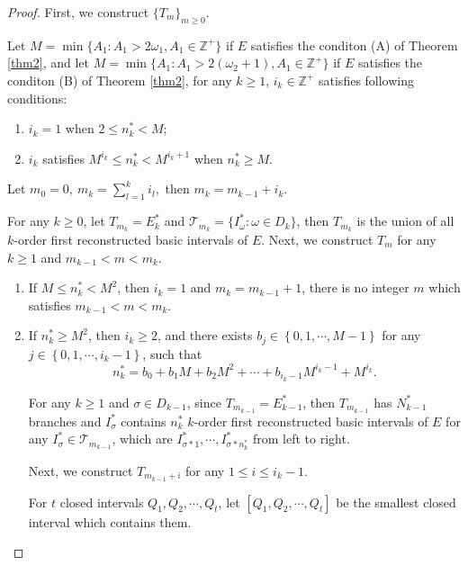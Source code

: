 \documentclass[reqno]{amsart}
\theoremstyle{plain}
\theoremstyle{definition}
\theoremstyle{remark}
\numberwithin{equation}{section} \DeclareMathOperator\intr{int}
\newcommand{\rmnum}[1]{\romannumeral #1}
\begin{document}
\begin{proof}
First, we construct $\{T_{m}\}_{m\ge 0}$.

Let $M=\min\{A_1:A_1>2\omega_1, A_1\in \mathbb{Z}^{+}\}$ if $E$ satisfies the conditon (A)  of Theorem {\rm\ref{thm2}}, and let $M=\min\{A_1:A_1>2(\omega_2+1),A_1\in \mathbb{Z}^{+}\}$ if $E$ satisfies the conditon (B)  of Theorem {\rm\ref{thm2}}, for any $k\ge 1$, $i_{k}\in \mathbb{Z}^{+}$ satisfies following conditions:
\begin{enumerate}
 \item[\textup{(\rmnum{1})}]$i_{k}=1$ when $2\le n_{k}^{*}<M$;
 \item[\textup{(\rmnum{2})}]$i_{k}$ satisfies $M^{i_{k}}\le n_{k}^{*}<M^{i_{k}+1}$ when $n_{k}^{*}\ge M$.
\end{enumerate}
Let $m_{0}=0,\ m_{k}=\sum_{l=1}^{k}i_{l},$ then $m_k=m_{k-1}+i_k.$
	
	For any $k\ge 0$, let $T_{m_{k}}=E_{k}^{*}$  and  $\mathcal{T}_{m_{k}}=\{I_{\omega}^{\ast}:\omega\in D_{k}\}$,
then $T_{m_{k}}$ is the union of all $k$-order first reconstructed basic intervals of $E$.
Next, we construct $T_{m}$ for any $k\ge 1$ and $m_{k-1}<m<m_{k}$.

\begin{enumerate}
		\item[\textup{(1)}] If $M\le n_{k}^{*}< M^{2}$, then $i_{k}=1$ and $m_k=m_{k-1}+1$, there is no integer $m$ which satisfies $m_{k-1}< m<m_k$.
		\item[\textup{(2)}] If $n_{k}^{*}\ge M^{2}$, then $i_{k}\ge 2$, and there exists  $b_{j}\in\left\{0,1,\cdots,M-1\right\}$  for any $j\in\left\{0,1,\cdots,i_{k}-1\right\}$, such that
\begin{equation*}
		n_{k}^{*}=b_{0}+b_{1}M+b_{2}M^{2}+\cdots+b_{i_{k}-1}M^{i_{k}-1}+M^{i_{k}}.
\end{equation*}
	
For any $k\ge1$ and $\sigma\in D_{k-1}$, since $T_{m_{k-1}}=E_{k-1}^{*}$, then $T_{m_{k-1}}$ has $N_{k-1}^{*}$ branches and
$I_{\sigma}^{*}$ contains $n_{k}^{*}$ $k$-order first reconstructed basic intervals of $E$ for any $I_{\sigma}^{*}\in \mathcal{T}_{m_{k-1}}$, which are  $I_{\sigma*1}^{*},\cdots,I_{\sigma*n_{k}^{*}}^{*}$  from left to right.

Next, we construct $T_{m_{k-1}+i}$ for any  $1\le i\le i_k-1$.

For $t$ closed intervals $Q_{1},Q_{2},\cdots,Q_{t}$, let $[Q_{1},Q_{2},\cdots,Q_{t}]$ be the smallest closed interval which contains them.


\end{enumerate}
\end{proof}
\end{document}
